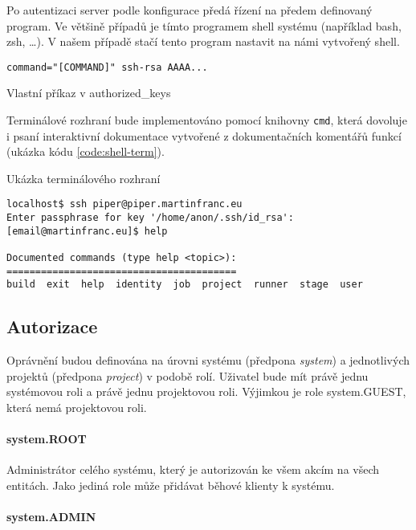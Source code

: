 Po autentizaci server podle konfigurace předá řízení na předem definovaný program.
Ve většině případů je tímto programem shell systému (například bash, zsh, \ldots).
V našem případě stačí tento program nastavit na námi vytvořený shell.

\begin{listing}[ht]
\begin{verbatim}
command="[COMMAND]" ssh-rsa AAAA...
\end{verbatim}
\caption{Vlastní příkaz v authorized\_keys}
\end{listing}

Terminálové rozhraní bude implementováno pomocí knihovny \verb|cmd|, která dovoluje i psaní interaktivní dokumentace vytvořené z dokumentačních komentářů funkcí (ukázka kódu \ref{code:shell-term}).

\begin{listing}[ht]
\caption{\label{code:shell-term}Ukázka terminálového rozhraní}
\begin{verbatim}
localhost$ ssh piper@piper.martinfranc.eu
Enter passphrase for key '/home/anon/.ssh/id_rsa': 
[email@martinfranc.eu]$ help

Documented commands (type help <topic>):
========================================
build  exit  help  identity  job  project  runner  stage  user

\end{verbatim}
\end{listing}

\subsection{Autorizace}

Oprávnění budou definována na úrovni systému (předpona \textit{system}) a jednotlivých projektů (předpona \textit{project}) v podobě rolí.
Uživatel bude mít právě jednu systémovou roli a právě jednu projektovou roli.
Výjimkou je role system.GUEST, která nemá projektovou roli.

\paragraph{system.ROOT}

Administrátor celého systému, který je autorizován ke všem akcím na všech entitách.
Jako jediná role může přidávat běhové klienty k systému.

\paragraph{system.ADMIN}


